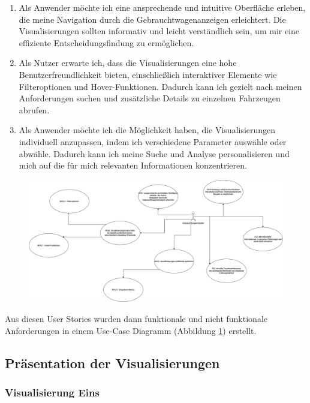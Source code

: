 \begin{enumerate}
    \item Als Anwender möchte ich eine ansprechende und intuitive Oberfläche erleben, die meine Navigation durch die Gebrauchtwagenanzeigen erleichtert. Die Visualisierungen sollten informativ und leicht verständlich sein, um mir eine effiziente Entscheidungsfindung zu ermöglichen.
    
    \item Als Nutzer erwarte ich, dass die Visualisierungen eine hohe Benutzerfreundlichkeit bieten, einschließlich interaktiver Elemente wie Filteroptionen und Hover-Funktionen. Dadurch kann ich gezielt nach meinen Anforderungen suchen und zusätzliche Details zu einzelnen Fahrzeugen abrufen.
    
    \item Als Anwender möchte ich die Möglichkeit haben, die Visualisierungen individuell anzupassen, indem ich verschiedene Parameter auswähle oder abwähle. Dadurch kann ich meine Suche und Analyse personalisieren und mich auf die für mich relevanten Informationen konzentrieren.
    
\end{enumerate}

\begin{figure}
    \centering
    \includegraphics[scale=0,5]{img/uc_diagram.png}
    \label{fig:uc_diagram}
\end{figure}

Aus diesen User Stories wurden dann funktionale und nicht funktionale Anforderungen in einem Use-Case Diagramm (Abbildung \ref*{fig:uc_diagram}) erstellt. \\
\subsection{Präsentation der Visualisierungen}
\subsubsection{Visualisierung Eins}

